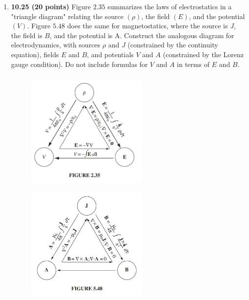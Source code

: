 \documentclass[fleqn]{article}
\begin{document}
\begin{enumerate}
    \pagebreak

    \item \textbf{10.25 (20 points)} Figure $2.35$ summarizes the laws of electrostatics in a "triangle
    diagram" relating the source $(\rho)$, the field $(E)$, and the potential $(V)$. Figure $5.48$
    does the same for magnetostatics, where the source is $J$, the field is $B$, and the
    potential is A. Construct the analogous diagram for electrodynamics, with sources
    $\rho$ and $J$ (constrained by the continuity equation), fields $E$ and $B$, and potentials $V$
    and $A$ (constrained by the Lorenz gauge condition). Do not include formulas for $V$
    and $A$ in terms of $E$ and $B$.
    \begin{figure}[htp]
      \centering
      \includegraphics[height=6cm, width=6cm]{2.JPG}
      \includegraphics[height=6cm, width=6cm]{3.JPG}
    \end{figure}


\end{enumerate}
\end{document}
